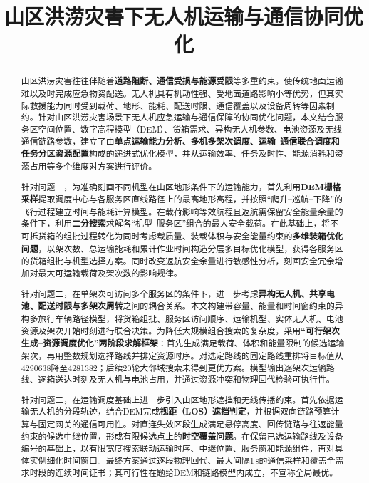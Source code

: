 \documentclass[bwprint,fontset=fandol]{gmcmthesis}
\title{山区洪涝灾害下无人机运输与通信协同优化
}
\begin{document}
\maketitle

\begin{abstract}

山区洪涝灾害往往伴随着\textbf{道路阻断、通信受损与能源受限}等多重约束，使传统地面运输难以及时完成应急物资配送。无人机具有机动性强、受地面道路影响小等优势，但其实际救援能力同时受到载荷、地形、能耗、配送时限、通信覆盖以及设备周转等因素制约。针对山区洪涝灾害场景下无人机应急运输与通信保障的协同优化问题，本文结合服务区空间位置、数字高程模型（DEM）、货箱需求、异构无人机参数、电池资源及无线通信链路参数，建立了由\textbf{单点运输能力分析、多机多架次调度、运输--通信联合调度和任务分区资源配置}构成的递进式优化模型，并从运输效率、任务及时性、能源消耗和资源占用等多个维度对方案进行评价。

针对问题一，为准确刻画不同机型在山区地形条件下的运输能力，首先利用\textbf{DEM栅格采样}提取调度中心与各服务区直线路径上的最高地形高程，并按照“爬升--巡航--下降”的飞行过程建立时间与能耗计算模型。在载荷影响等效航程且返航需保留安全能量余量的条件下，利用\textbf{二分搜索}求解各“机型--服务区”组合的最大安全载荷。在此基础上，将不可拆货箱的组批过程转化为同时考虑载质量、装载体积与安全能量约束的\textbf{多维装箱优化问题}，以架次数、总运输能耗和累计作业时间构造分层多目标优化模型，获得各服务区的货箱组批与机型选择方案。同时改变返航安全余量进行敏感性分析，刻画安全冗余增加对最大可运输载荷及架次数的影响规律。

针对问题二，在单架次可访问多个服务区的条件下，进一步考虑\textbf{异构无人机、共享电池、配送时限与多架次周转}之间的耦合关系。本文构建带容量、能量和时间窗约束的异构多旅行车辆路径模型，将货箱组批、服务区访问顺序、运输机型、实体无人机、电池资源及架次开始时刻进行联合决策。为降低大规模组合搜索的复杂度，采用\textbf{“可行架次生成--资源调度优化”两阶段求解框架}：首先生成满足载荷、体积和能量限制的候选运输架次，再用整数规划选择路线并排定资源时序。对选定路线的固定路线重排将目标值从4290638降至4281382；后续20轮大邻域搜索未得到更优方案。模型输出逐架次运输路线、逐箱送达时刻及无人机与电池占用，并通过资源冲突和物理回代检验可执行性。

针对问题三，在运输调度基础上进一步引入山区地形遮挡和无线传播约束。首先依据运输无人机的分段轨迹，结合DEM完成\textbf{视距（LOS）遮挡判定}，并根据双向链路预算计算与固定网关的通信可用性。对直连失效区段生成满足悬停高度、回传链路与往返能量约束的候选中继位置，形成有限候选点上的\textbf{时空覆盖问题}。在保留已选运输路线及设备编号的基础上，以有限宽度搜索联动运输时序、中继位置、服务窗和能源组件，再对具体实例细化时间窗口。最终方案通过逐段物理回代、最大间隔1\,s的通信采样和覆盖全需求时段的连续时间证书；其可行性在题给DEM和链路模型内成立，不宣称全局最优。


\end{abstract}
\end{document}
